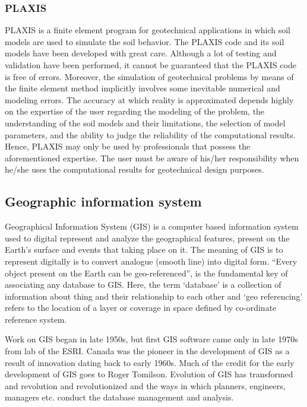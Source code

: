 \subsubsection{PLAXIS}
PLAXIS is a finite element program for geotechnical applications in which soil models are used to simulate the soil behavior. The PLAXIS code and its soil models have been developed with great care. Although a lot of testing and validation have been performed, it cannot be guaranteed that the PLAXIS code is free of errors. Moreover, the simulation of geotechnical problems by means of the finite element method implicitly involves some inevitable numerical and modeling errors. The accuracy at which reality is approximated depends highly on the expertise of the user regarding the modeling of the problem, the understanding of the soil models and their limitations, the selection of model parameters, and the ability to judge the reliability of the computational results. Hence, PLAXIS may only be used by professionals that possess the aforementioned expertise. The user must be aware of his/her responsibility when he/she uses the computational results for geotechnical design purposes.

\subsection{Geographic information system}
Geographical Information System (GIS) is a computer based information system used to digital represent and analyze the geographical features, present on the Earth’s surface and events that taking place on it. The meaning of GIS is to represent digitally is to convert analogue (smooth line) into digital form.
“Every object present on the Earth can be geo-referenced”, is the fundamental key of associating any database to GIS. Here, the term ‘database’ is a collection of information about thing and their relationship to each other and ‘geo referencing’ refers to the location of a layer or coverage in space defined by co-ordinate reference system.

Work on GIS began in late 1950s, but first GIS software came only in late 1970s from lab of the ESRI. Canada was the pioneer in the development of GIS as a result of innovation dating back to early 1960s. Much of the credit for the early development of GIS goes to Roger Tomilson. Evolution of GIS has transformed and revolution and revolutionized and the ways in which planners, engineers, managers etc. conduct the database management and analysis.

